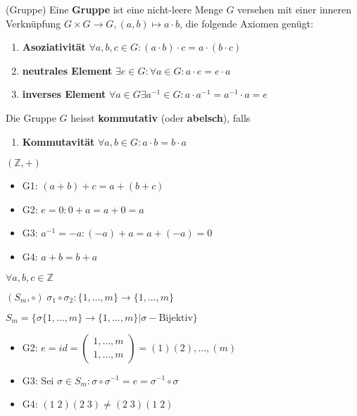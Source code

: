 \documentclass[../Algebra_script.tex]{subfiles}
\begin{document}
\begin{definition}{(Gruppe)}
    Eine \textbf{Gruppe} ist eine nicht-leere Menge $G$ versehen mit einer inneren Verknüpfung $G \times G \to G, (a, b) \mapsto a \cdot b$, die folgende Axiomen genügt:
    \begin{enumerate}
        \item{\textbf{Asoziativität}} $\forall a, b, c \in G: (a \cdot b) \cdot c = a \cdot (b \cdot c)$
        \item{\textbf{neutrales Element}} $\exists e \in G : \forall a \in G : a \cdot e = e \cdot a$
        \item{\textbf{inverses Element}} $\forall a \in G \exists a^{-1} \in G : a \cdot a^{-1} = a^{-1} \cdot a = e$
    \end{enumerate}
    Die Gruppe $G$ heisst \textbf{kommutativ} (oder \textbf{abelsch}), falls
    \begin{enumerate}[resume]
        \item{\textbf{Kommutavität}} $\forall a, b \in G : a \cdot b = b \cdot a$
    \end{enumerate} 
\end{definition}

\begin{example}{$(\mathbb{Z}, +)$}
    \begin{itemize}
        \item{G1:} $(a + b) + c = a + (b + c)$
        \item{G2:} $e = 0 : 0 + a = a + 0 = a$
        \item{G3:} $a^{-1} = -a: (-a) + a = a + (-a) = 0$
        \item{G4:} $a + b = b + a$
    \end{itemize}
    $\forall a, b, c \in \mathbb{Z}$
\end{example}
\begin{example}{$(S_m, \circ)\; \sigma_1 \circ \sigma_2: \{1, \ldots, m\} \to \{1, \ldots, m\}$}

    $S_m = \big\{ \sigma \{1, \ldots, m\} \to \{1, \ldots, m\}| \sigma - \text{Bijektiv}\big\}$
    \begin{itemize}
        \item{G2:} $e = id = \left(
            \begin{array}{c}
                1, \ldots, m\\
                1, \ldots, m
            \end{array}
            \right) = (1)(2), \ldots, (m)$
        \item{G3:} Sei $\sigma \in S_m: \sigma \circ \sigma^{-1} = e = \sigma^{-1}\circ \sigma$
        \item{G4:} $(1\; 2)(2\; 3) \neq (2\; 3)(1\; 2)$
    \end{itemize}
\end{example}
\end{document}

